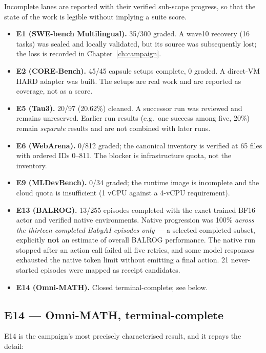 Incomplete lanes are reported with their verified sub-scope progress, so that the
state of the work is legible without implying a suite score.

\begin{itemize}[leftmargin=1.4em,itemsep=3pt]
  \item \textbf{E1 (SWE-bench Multilingual).} 35/300 graded. A wave10 recovery
  (16 tasks) was sealed and locally validated, but its source was subsequently
  lost; the loss is recorded in Chapter~\ref{ch:campaign}.
  \item \textbf{E2 (CORE-Bench).} 45/45 capsule setups complete, 0 graded. A
  direct-VM HARD adapter was built. The setups are real work and are reported as
  coverage, not as a score.
  \item \textbf{E5 (Tau3).} 20/97 (20.62\%) cleaned. A successor run was reviewed
  and remains unreserved. Earlier run results (e.g.\ one success among five, 20\%)
  remain \emph{separate} results and are not combined with later runs.
  \item \textbf{E6 (WebArena).} 0/812 graded; the canonical inventory is verified
  at 65 files with ordered IDs 0--811. The blocker is infrastructure quota, not
  the inventory.
  \item \textbf{E9 (MLDevBench).} 0/34 graded; the runtime image is incomplete and
  the cloud quota is insufficient (1 vCPU against a 4-vCPU requirement).
  \item \textbf{E13 (BALROG).} 13/255 episodes completed with the exact trained
  BF16 actor and verified native environments. Native progression was 100\%
  \emph{across the thirteen completed BabyAI episodes only} --- a selected
  completed subset, explicitly \textbf{not} an estimate of overall BALROG
  performance. The native run stopped after an action call failed all five
  retries, and some model responses exhausted the native token limit without
  emitting a final action. 21 never-started episodes were mapped as receipt
  candidates.
  \item \textbf{E14 (Omni-MATH).} Closed terminal-complete; see below.
\end{itemize}

\subsection{E14 --- Omni-MATH, terminal-complete}

E14 is the campaign's most precisely characterised result, and it repays the
detail:

